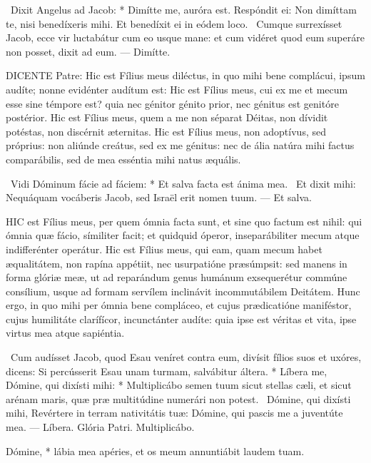\R\ Dixit Angelus ad Jacob: * Dimítte me, auróra est. Respóndit ei: Non dimíttam te, nisi benedíxeris mihi. Et benedíxit ei in eódem loco. \V\ Cumque surrexísset Jacob, ecce vir luctabátur cum eo usque mane: et cum vidéret quod eum superáre non posset, dixit ad eum. --- Dimítte.


\lettrine[lines=2]{D}{ICENTE} Patre: Hic est Fílius meus diléctus, in quo mihi bene complácui, ipsum audíte; nonne evidénter audítum est: Hic est Fílius meus, cui ex me et mecum esse sine témpore est? quia nec génitor génito prior, nec génitus est genitóre postérior. Hic est Fílius meus, quem a me non séparat Déitas, non dívidit potéstas, non discérnit æternitas. Hic est Fílius meus, non adoptívus, sed próprius: non aliúnde creátus, sed ex me génitus: nec de ália natúra mihi factus comparábilis, sed de mea esséntia mihi natus æquális.

\R\ Vidi Dóminum fácie ad fáciem: * Et salva facta est ánima mea. \V\ Et dixit mihi: Nequáquam vocáberis Jacob, sed Israël erit nomen tuum. --- Et salva.


\lettrine[lines=2]{H}{IC} est Fílius meus, per quem ómnia facta sunt, et sine quo factum est nihil: qui ómnia quæ fácio, símiliter facit; et quidquid óperor, inseparábiliter mecum atque indifferénter operátur. Hic est Fílius meus, qui eam, quam mecum habet æqualitátem, non rapína appétiit, nec usurpatióne præsúmpsit: sed manens in forma glóriæ meæ, ut ad reparándum genus humánum exsequerétur commúne consílium, usque ad formam servílem inclinávit incommutábilem Deitátem. Hunc ergo, in quo mihi per ómnia bene compláceo, et cujus prædicatióne maniféstor, cujus humilitáte clarífícor, incunctánter audíte: quia ipse est véritas et vita, ipse virtus mea atque sapiéntia.

\R\ Cum audísset Jacob, quod Esau veníret contra eum, divísit fílios suos et uxóres, dicens: Si percússerit Esau unam turmam, salvábitur áltera. * Líbera me, Dómine, qui dixísti mihi: * Multiplicábo semen tuum sicut stellas cæli, et sicut arénam maris, quæ præ multitúdine numerári non potest. \V\ Dómine, qui dixísti mihi, Revértere in terram nativitátis tuæ: Dómine, qui pascis me a juventúte mea. --- Líbera. Glória Patri. Multiplicábo.


 Dómine, * lábia mea apéries, et os meum annuntiábit laudem tuam.

